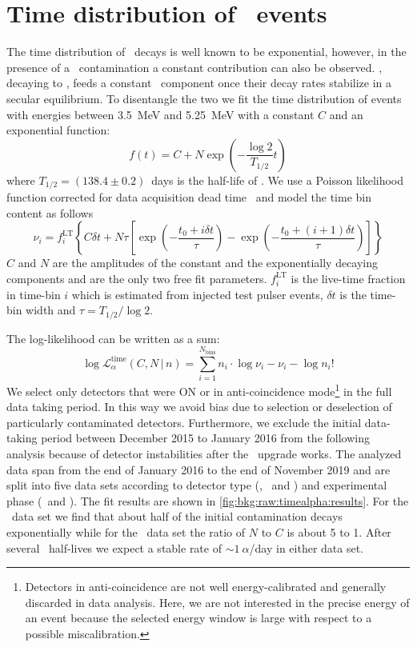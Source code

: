 
\chapter{\texorpdfstring{Time distribution of \a\ events}{Time distribution of alpha-events}}%
\label{apdx:timealpha}

The time distribution of \Po\ decays is well known to be exponential, however, in the
presence of a \Pbl\ contamination a constant contribution can also be observed. \Pbl,
decaying to \Po, feeds a constant \Po\ component once their decay rates stabilize in a
secular equilibrium. To disentangle the two we fit the time distribution of events with
energies between 3.5~MeV and 5.25~MeV with a constant $C$ and an exponential function:
\[
  f(t) = C + N \exp\left( - \frac{\log2}{T_{1/2}}t \right)
\]
where $T_{1/2}=(138.4\pm0.2)$~days is the half-life of \Po. We use a Poisson likelihood
function corrected for data acquisition dead time~\cite{Cleveland1983} and model the time
bin content as follows
\[
  \nu_i = f_i^{\mathrm{LT}}
  \left\{ C \delta t + N \tau
    \left[
      \exp\left( -\frac{t_0 + i \delta t}{\tau} \right)  -
      \exp\left( -\frac{t_0 + (i+1) \delta t}{\tau} \right)
    \right]
  \right\}
\]
$C$ and $N$ are the amplitudes of the constant and the exponentially decaying components
and are the only two free fit parameters.  $f_i^{\mathrm{LT}}$ is the live-time fraction
in time-bin $i$ which is estimated from injected test pulser events, $\delta t$ is the
time-bin width and $\tau = T_{1/2} / \log2$.

The log-likelihood can be written as a sum:
\[
  \log \mathcal{L}_\alpha^\text{time}(C,N \,|\, n) =
  \sum_{i=1}^{N_\text{bins}} n_i \cdot
  \log\nu_i - \nu_i - \log n_i!
\]
We select only detectors that were ON or in anti-coincidence mode\footnote{Detectors in
anti-coincidence are not well energy-calibrated and generally discarded in data analysis.
Here, we are not interested in the precise energy of an event because the selected energy
window is large with respect to a possible miscalibration.} in the full data taking
period. In this way we avoid bias due to selection or deselection of particularly
contaminated detectors. Furthermore, we exclude the initial data-taking period between
December 2015 to January 2016 from the following analysis because of detector
instabilities after the \phasetwo\ upgrade works. The analyzed data span from the end of
January 2016 to the end of November 2019 and are split into five data sets according to
detector type (\bege, \scoax\ and \icoax) and experimental phase (\phaseone\ and
\phasetwop). The fit results are shown in \autoref{fig:bkg:raw:timealpha:results}. For the
\bege\ data set we find that about half of the initial contamination decays exponentially
while for the \scoax\ data set the ratio of $N$ to $C$ is about 5 to 1. After several \Po\
half-lives we expect a stable rate of $\sim1~\alpha$/day in either data set.
\fillme{comment}

